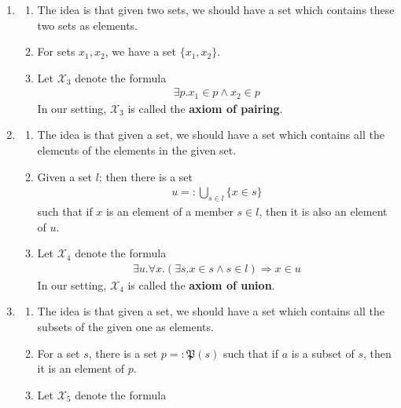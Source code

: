 \begin{enumerate}
\begin{enumerate}
In our setting, $\mathcal{X}_{2}$ is called the \textbf{axiom schema of specification}.
\end{enumerate}
\item[(3)]
\begin{enumerate}
\item[$\bullet$]
The idea is that given two sets, we should have a set which contains these two sets as elements.
\item[$\bullet$]
For sets $x_{1},x_{2}$, we have a set $\lbrace x_{1},x_{2} \rbrace$.
\item[$\bullet$]
Let $\mathcal{X}_{3}$ denote the formula
\begin{align*}
  \exists
  p
  .
  x_{1}
  \in
  p
  \land
  x_{2}
  \in
  p
\end{align*}
In our setting, $\mathcal{X}_{3}$ is called the \textbf{axiom of pairing}.
\end{enumerate}
\item[(4)]
\begin{enumerate}
\item[$\bullet$]
The idea is that given a set, we should have a set which contains all the elements of the elements in the given set.
\item[$\bullet$]
Given a set $l$; then there is a set
\begin{align*}
  u
  =:
  \bigcup_{s \in l}
  \lbrace
    x
    \in
    s
  \rbrace
\end{align*}
such that if $x$ is an element of a member $s \in l$, then it is also an element of $u$.
\item[$\bullet$]
Let $\mathcal{X}_{4}$ denote the formula
\begin{align*}
  \exists
  u
  .
  \forall
  x
  .
  \left(
    \exists
    s
    .
    x
    \in
    s
    \land
    s
    \in
    l
  \right)
  \Rightarrow
  x
  \in
  u
\end{align*}
In our setting, $\mathcal{X}_{4}$ is called the \textbf{axiom of union}.
\end{enumerate}
\item[(5)]
\begin{enumerate}
\item[$\bullet$]
The idea is that given a set, we should have a set which contains all the subsets of the given one as elements.
\item[$\bullet$]
For a set $s$, there is a set $p =: \mathfrak{P}(s)$ such that if $a$ is a subset of $s$, then it is an element of $p$.
\item[$\bullet$]
  Let $\mathcal{X}_{5}$ denote the formula

\end{enumerate}
\end{enumerate}
